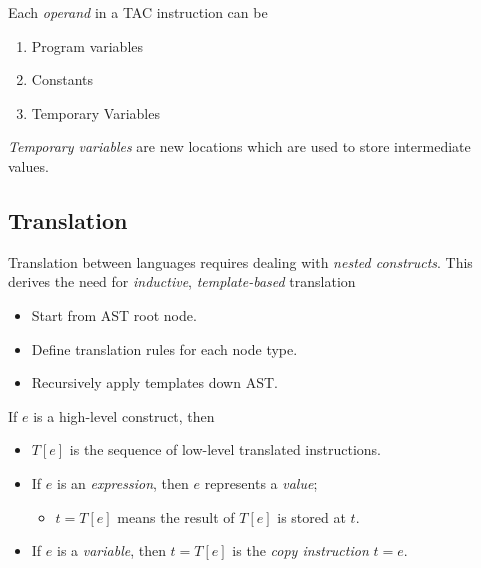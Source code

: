 \begin{definition}
    Each \textit{operand} in a TAC instruction can be
    \begin{enumerate}
        \item Program variables
        \item Constants
        \item Temporary Variables
    \end{enumerate}
\end{definition}

\begin{definition}
    \textit{Temporary variables} are new locations which are used to store intermediate values.
\end{definition}

\subsection{Translation}

\begin{definition}[Translation]
    Translation between languages requires dealing with \textit{nested constructs}. This derives the need for \textit{inductive}, \textit{template-based} translation
    \begin{itemize}
        \item Start from AST root node.
        \item Define translation rules for each node type.
        \item Recursively apply templates down AST.
    \end{itemize}
\end{definition}

\begin{definition}
    If $e$ is a high-level construct, then
    \begin{itemize}
        \item $T[e]$ is the sequence of  low-level translated instructions.
        \item If $e$ is an \textit{expression}, then $e$ represents a \textit{value};
        \begin{itemize}
           \item $t = T[e]$ means the result of $T[e]$ is stored at $t$.
        \end{itemize}
        \item If $e$ is a \textit{variable}, then $t = T[e]$ is the \textit{copy instruction} $t = e$.
    \end{itemize}
\end{definition}

